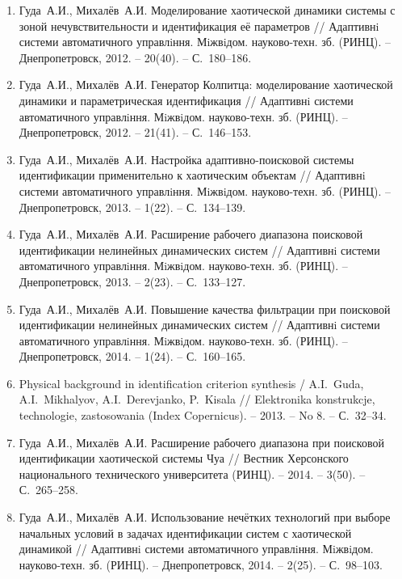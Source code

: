 \begin{enumerate}
\item
Гуда~А.И., Михалёв~А.И. Моделирование хаотической динамики системы с зоной
нечувствительности и идентификация её параметров
// Адаптивнi системи автоматичного управлiння. Мiжвiдом. науково-техн. зб. (РИНЦ).
 -- Днепропетровск, 2012. -- 20(40). -- С.~180--186.

\item
Гуда~А.И., Михалёв~А.И. Генератор Колпитца: моделирование хаотической динамики
и параметрическая идентификация // Адаптивнi системи автоматичного управлiння.
Мiжвiдом. науково-техн. зб. (РИНЦ). -- Днепропетровск, 2012. -- 21(41). -- С.~146--153.

\item
Гуда~А.И., Михалёв~А.И. Настройка адаптивно-поисковой системы идентификации
применительно к хаотическим объектам // Адаптивнi системи автоматичного
управлiння. Мiжвiдом. науково-техн. зб. (РИНЦ). -- Днепропетровск, 2013. -- 1(22). --
С.~134--139.

\item
Гуда~А.И., Михалёв~А.И. Расширение рабочего диапазона поисковой идентификации
нелинейных динамических систем // Адаптивнi системи автоматичного управлiння.
Мiжвiдом. науково-техн. зб. (РИНЦ). -- Днепропетровск, 2013. -- 2(23). -- С.~133--127.

\item
Гуда~А.И., Михалёв~А.И. Повышение качества фильтрации при поисковой идентификации
нелинейных динамических систем // Адаптивнi системи автоматичного
управлiння. Мiжвiдом. науково-техн. зб. (РИНЦ). -- Днепропетровск, 2014. -- 1(24). -- С.~160--165.

\item
Physical background in identification criterion synthesis /
A.I.~Guda, A.I.~Mikhalyov, A.I.~Derevjanko, P.~Kisala
// Elektronika konstrukcje, technologie, zastosowania (Index Copernicus). -- 2013. -- No 8. -- С.~32--34.

\item
Гуда~А.И., Михалёв~А.И. Расширение рабочего диапазона при поисковой идентификации
хаотической системы Чуа // Вестник Херсонского национального технического
университета (РИНЦ). -- 2014. -- 3(50). -- С.~265--258.

\item
Гуда~А.И., Михалёв~А.И. Использование нечётких технологий при выборе начальных
условий в задачах идентификации систем с хаотической динамикой
// Адаптивнi системи автоматичного управлiння. Мiжвiдом. науково-техн. зб. (РИНЦ).
-- Днепропетровск, 2014. -- 2(25). -- С.~98--103.


\end{enumerate}
